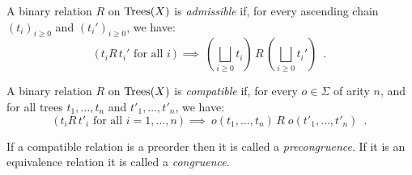 %
%
%
%



\begin{definition}[Admissibility]
    A binary relation $R$ on $\textnormal{Trees}(X)$ is \emph{admissible} if,
    for every ascending chain $(t_i)_{i \geq 0}$ and 
    $(t_i')_{i\geq 0}$, we have:
    \[ \text{($\,t_i  R \, t_i'$ for all $i\,$)} ~ \implies~
        \left(\bigsqcup_{i \geq 0} t_i\right) \, R \, \left(\bigsqcup_{i \geq 0} t_i'\right) \enspace .
    \]
\end{definition}

\begin{definition}[Compatibility]
    A binary relation $R$ on $\textnormal{Trees}(X)$ is  \emph{compatible} if,
    for every $o \in \Sigma$ of arity $n$, and for all trees 
     $t_1,\dots, t_n$ and $t'_1, \dots, t'_n$, we have:
    \[ \text{($\,t_i  R \, t'_i$ for all $i = 1, \dots, n\,$)} ~ \implies ~ 
        o(t_1, \dots, t_n) \, R \; o(t'_1, \dots, t'_n) \enspace .
    \]
\end{definition}
If a compatible relation is a preorder then it is called a \emph{precongruence}. If it is an equivalence relation it is called a \emph{congruence}.

